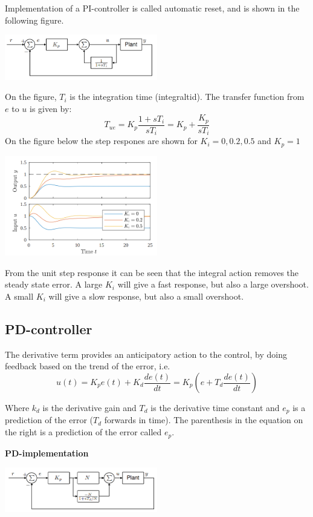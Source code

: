 Implementation of a PI-controller is called automatic reset, and is
shown in the following figure.


\begin{center}
	\includegraphics[width = 0.5\textwidth]{Images/PI-implementation.png}
\end{center}

On the figure, $T_i$ is the integration time (integraltid). The
transfer function from $e$ to $u$ is given by:
$$ T_{ue} = K_p \frac{1 + sT_i}{sT_i} = K_p + \frac{K_p}{sT_i} $$
\newpage
On the figure below the step respones are shown for $K_i = 0,0.2,0.5$ and $K_p = 1$
\begin{center}
	\includegraphics[width = 0.5\textwidth]{Images/PI-unitStep.png}
\end{center}
From the unit step response it can be seen that the integral action removes
the steady state error. A large $K_i$ will give a fast response, but also
a large overshoot. A small $K_i$ will give a slow response, but also a small
overshoot.


\subsection{PD-controller}
The derivative term provides an anticipatory action to the control,
by doing feedback based on the trend of the error, i.e.
$$u(t) = K_p e(t) + K_d \frac{de(t)}{dt} = K_p \left(e+T_d\frac{de(t)}{dt}\right)$$

Where $k_d$ is the derivative gain and $T_d$ is the derivative time constant and $e_p$
is a prediction of the error  ($T_d$ forwards in time). The parenthesis in the equation on the right
is a prediction of the error called $e_p$.

\textbf{PD-implementation}
\begin{center}
	\includegraphics[width = 0.5\textwidth]{Images/PD-implementation.png}
\end{center}


